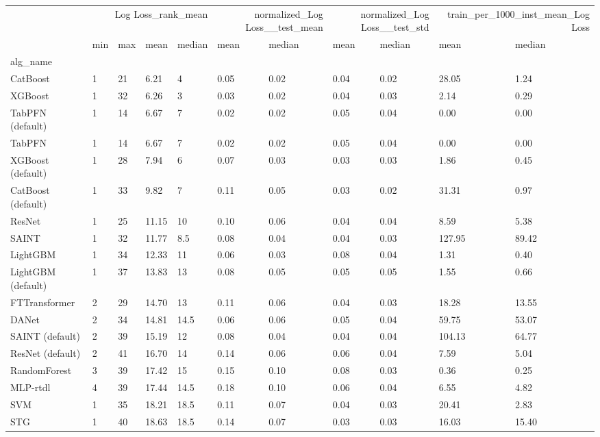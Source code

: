 \begin{tabular}{lllllllllll}
\toprule
 & \multicolumn{4}{r}{Log Loss_rank_mean} & \multicolumn{2}{r}{normalized_Log Loss__test_mean} & \multicolumn{2}{r}{normalized_Log Loss__test_std} & \multicolumn{2}{r}{train_per_1000_inst_mean_Log Loss} \\
 & min & max & mean & median & mean & median & mean & median & mean & median \\
alg_name &  &  &  &  &  &  &  &  &  &  \\
\midrule
CatBoost & 1 & 21 & 6.21 & 4 & 0.05 & 0.02 & 0.04 & 0.02 & 28.05 & 1.24 \\
XGBoost & 1 & 32 & 6.26 & 3 & 0.03 & 0.02 & 0.04 & 0.03 & 2.14 & 0.29 \\
TabPFN (default) & 1 & 14 & 6.67 & 7 & 0.02 & 0.02 & 0.05 & 0.04 & 0.00 & 0.00 \\
TabPFN & 1 & 14 & 6.67 & 7 & 0.02 & 0.02 & 0.05 & 0.04 & 0.00 & 0.00 \\
XGBoost (default) & 1 & 28 & 7.94 & 6 & 0.07 & 0.03 & 0.03 & 0.03 & 1.86 & 0.45 \\
CatBoost (default) & 1 & 33 & 9.82 & 7 & 0.11 & 0.05 & 0.03 & 0.02 & 31.31 & 0.97 \\
ResNet & 1 & 25 & 11.15 & 10 & 0.10 & 0.06 & 0.04 & 0.04 & 8.59 & 5.38 \\
SAINT & 1 & 32 & 11.77 & 8.5 & 0.08 & 0.04 & 0.04 & 0.03 & 127.95 & 89.42 \\
LightGBM & 1 & 34 & 12.33 & 11 & 0.06 & 0.03 & 0.08 & 0.04 & 1.31 & 0.40 \\
LightGBM (default) & 1 & 37 & 13.83 & 13 & 0.08 & 0.05 & 0.05 & 0.05 & 1.55 & 0.66 \\
FTTransformer & 2 & 29 & 14.70 & 13 & 0.11 & 0.06 & 0.04 & 0.03 & 18.28 & 13.55 \\
DANet & 2 & 34 & 14.81 & 14.5 & 0.06 & 0.06 & 0.05 & 0.04 & 59.75 & 53.07 \\
SAINT (default) & 2 & 39 & 15.19 & 12 & 0.08 & 0.04 & 0.04 & 0.04 & 104.13 & 64.77 \\
ResNet (default) & 2 & 41 & 16.70 & 14 & 0.14 & 0.06 & 0.06 & 0.04 & 7.59 & 5.04 \\
RandomForest & 3 & 39 & 17.42 & 15 & 0.15 & 0.10 & 0.08 & 0.03 & 0.36 & 0.25 \\
MLP-rtdl & 4 & 39 & 17.44 & 14.5 & 0.18 & 0.10 & 0.06 & 0.04 & 6.55 & 4.82 \\
SVM & 1 & 35 & 18.21 & 18.5 & 0.11 & 0.07 & 0.04 & 0.03 & 20.41 & 2.83 \\
STG & 1 & 40 & 18.63 & 18.5 & 0.14 & 0.07 & 0.03 & 0.03 & 16.03 & 15.40 \\

\end{tabular}
